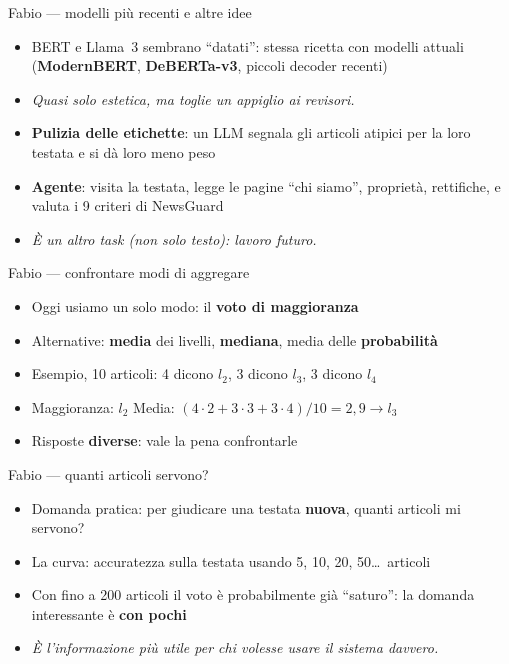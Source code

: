 \documentclass[aspectratio=169]{beamer}
\newcommand{\hl}[1]{\textbf{#1}}
\begin{document}
\begin{frame}{Fabio --- modelli pi\`u recenti e altre idee}
  \vfill
  \begin{itemize}[<+->]
    \setlength\itemsep{0.7em}
    \item BERT e Llama~3 sembrano ``datati'': stessa ricetta con modelli attuali (\hl{ModernBERT}, \hl{DeBERTa-v3}, piccoli decoder recenti)
    \item[] {\small\itshape Quasi solo estetica, ma toglie un appiglio ai revisori.}
    \item \hl{Pulizia delle etichette}: un LLM segnala gli articoli atipici per la loro testata e si d\`a loro meno peso
    \item \hl{Agente}: visita la testata, legge le pagine ``chi siamo'', propriet\`a, rettifiche, e valuta i 9 criteri di NewsGuard
    \item[] {\small\itshape \`E un altro task (non solo testo): lavoro futuro.}
  \end{itemize}
  \vfill
\end{frame}


\begin{frame}{Fabio --- confrontare modi di aggregare}
  \vfill
  \begin{itemize}[<+->]
    \setlength\itemsep{0.8em}
    \item Oggi usiamo un solo modo: il \hl{voto di maggioranza}
    \item Alternative: \hl{media} dei livelli, \hl{mediana}, media delle \hl{probabilit\`a}
    \item Esempio, 10 articoli: 4 dicono $l_2$, 3 dicono $l_3$, 3 dicono $l_4$
    \item[] Maggioranza: $l_2$ \qquad Media: $(4{\cdot}2+3{\cdot}3+3{\cdot}4)/10 = 2{,}9 \rightarrow l_3$
    \item Risposte \hl{diverse}: vale la pena confrontarle
  \end{itemize}
  \vfill
\end{frame}

\begin{frame}{Fabio --- quanti articoli servono?}
  \vfill
  \begin{itemize}[<+->]
    \setlength\itemsep{0.8em}
    \item Domanda pratica: per giudicare una testata \hl{nuova}, quanti articoli mi servono?
    \item La curva: accuratezza sulla testata usando 5, 10, 20, 50\dots\ articoli
    \item Con fino a 200 articoli il voto \`e probabilmente gi\`a ``saturo'': la domanda interessante \`e \hl{con pochi}
    \item[] {\small\itshape \`E l'informazione pi\`u utile per chi volesse usare il sistema davvero.}
  \end{itemize}
  \vfill
\end{frame}
\end{document}
